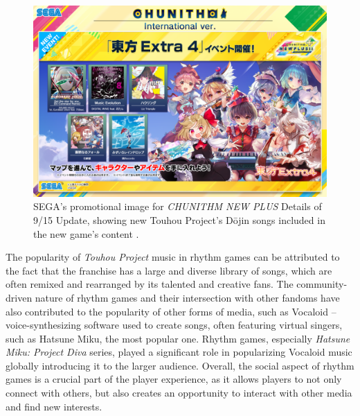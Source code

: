 \begin{figure}[h]
    \centering\includegraphics[scale=0.342]{obrazki/chunithm.png}
    \caption{SEGA's promotional image for \textit{CHUNITHM NEW PLUS} Details of 9/15 Update, showing new Touhou Project's Dōjin songs included in the new game's content \cite{chuni}.}
    \label{fig:chunithmupdates}
\end{figure}

The popularity of \textit{Touhou Project} music in rhythm games can be attributed to the fact that the franchise has a large and diverse library of songs, which are often remixed and rearranged by its talented and creative fans. The community-driven nature of rhythm games and their intersection with other fandoms have also contributed to the popularity of other forms of media, such as Vocaloid -- voice-synthesizing software used to create songs, often featuring virtual singers, such as Hatsune Miku, the most popular one. Rhythm games, especially \textit{Hatsune Miku: Project Diva} series, played a significant role in popularizing Vocaloid music globally introducing it to the larger audience. Overall, the social aspect of rhythm games is a crucial part of the player experience, as it allows players to not only connect with others, but also creates an opportunity to interact with other media and find new interests.

